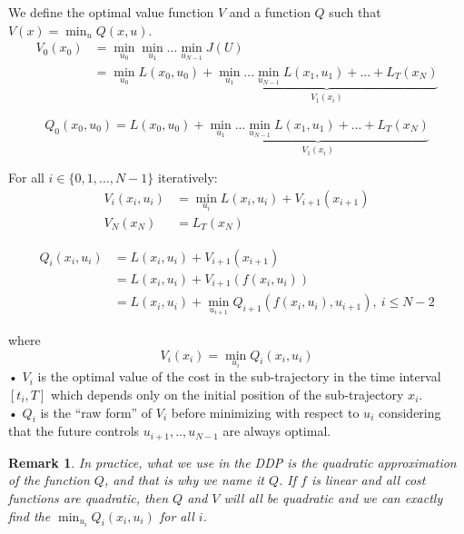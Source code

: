 \documentclass{report}
\newtheorem*{remark}{Remark}
\begin{document}
\medskip
We define the optimal value function $V$ and a function $Q$ such that $V(x) = \min_{u} Q(x, u)$.
\begin{equation}
\begin{split}
V_0(x_0) &= \min_{u_0} \min_{u_1} ... \min_{u_{N-1}} J(U) \\
			&= \min_{u_0} L(x_0, u_0)  + \underbrace{\min_{u_1} ... \min_{u_{N-1}} L(x_1, u_1)+... +L_T(x_N)}_{V_1(x_i)}
\end{split}
\end{equation}


\begin{equation}
Q_0(x_0, u_0) =L(x_0, u_0)  +\underbrace{\min_{u_1} ... \min_{u_{N-1}} L(x_1, u_1)+... +L_T(x_N)}_{V_1(x_i)}
\end{equation}


\medskip

For all  $i\in \{0, 1, ..., N-1\}$ iteratively:
\begin{equation}
\begin{split}
V_i(x_i,u_i) &= \min_{u_i}L(x_i,u_i) + V_{i+1}(x_{i+1}) \\
		V_N(x_N) &= L_T(x_N)
\end{split}
\end{equation}

\begin{equation}
\begin{split}
Q_i(x_i,u_i) &= L(x_i,u_i) + V_{i+1}(x_{i+1}) \\
				&= L(x_i,u_i) + V_{i+1}(f(x_i,u_i)) \\
				&= L(x_i,u_i) + \min_{u_{i+1}} Q_{i+1}(f(x_i,u_i), u_{i+1}),\ i \le N-2
\end{split}
\end{equation}

where
\begin{equation}
V_i(x_i) = \min_{u_i} Q_i(x_i, u_i) 
\end{equation}•
$V_i$ is the optimal value of the cost in the sub-trajectory in the time interval $[t_i, T]$ which depends only on the initial position of the sub-trajectory $x_i$.
\\•
$Q_i$ is the ``raw form'' of $V_i$ before minimizing with respect to $u_i$ considering that the future controls $u_{i+1}, .., u_{N-1}$ are always optimal. 

\begin{remark}
In practice, what we use in the DDP is the quadratic approximation of the function $Q$, and that is why we name it $Q$. If $f$ is linear and all cost functions are quadratic, then $Q$ and $V$ will all be quadratic and we can exactly find the $\min_{u_i} Q_i(x_i, u_i) $ for all $i$.
\end{remark}
\end{document}
